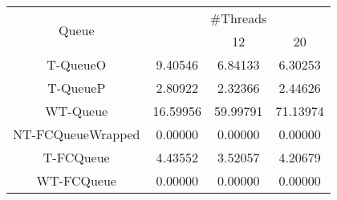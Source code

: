 \begin{tabular}{|c|c|c|c|}
\hline
\multirow{2}{*}{Queue} & \multicolumn{3}{c|}{\#Threads}\\\cline{2-4}& \quad 4 & 12 & 20\\
\hline
\hline
T-QueueO & 9.40546 & 6.84133 & 6.30253\\
T-QueueP & 2.80922 & 2.32366 & 2.44626\\
WT-Queue & 16.59956 & 59.99791 & 71.13974\\
NT-FCQueueWrapped & 0.00000 & 0.00000 & 0.00000\\
T-FCQueue & 4.43552 & 3.52057 & 4.20679\\
WT-FCQueue & 0.00000 & 0.00000 & 0.00000\\
\hline\end{tabular}
